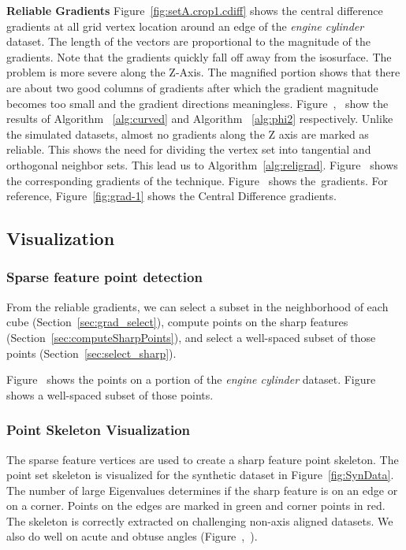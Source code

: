\textbf{Reliable Gradients} 
Figure~\ref{fig:setA.crop1.cdiff} shows the central difference gradients at all grid vertex location around an edge of the \textit{engine cylinder} dataset.
The length of the vectors are proportional to the magnitude of the gradients. Note that the gradients quickly fall off away from the isosurface. 
The problem is more severe along the Z-Axis. 
The magnified portion shows that there are about two good columns of gradients after which the gradient magnitude becomes too small and the gradient directions meaningless. 
Figure~,~ show the results of Algorithm ~\ref{alg:curved} and Algorithm ~\ref{alg:phi2} respectively. Unlike the simulated datasets, almost no gradients along the Z axis are marked as reliable. This shows the need for dividing the vertex set into tangential and orthogonal neighbor sets. This lead us to Algorithm~\ref{alg:religrad}. Figure~ shows the corresponding gradients of the \FindReliable technique. Figure~ shows the~\ReliGrad gradients. For reference, Figure~\ref{fig:grad-1} shows the Central Difference gradients. 
  
\subsection{Visualization}
\subsubsection{Sparse feature point detection}
\label{sec:sparsePointExtraction}

From the reliable gradients, we can select a subset in the neighborhood of each cube (Section~\ref{sec:grad_select}),
compute points on the sharp features (Section~\ref{sec:computeSharpPoints}),
and select a well-spaced subset 
of those points (Section~\ref{sec:select_sharp}).

Figure~ shows the points on
a portion of the \textit{ engine cylinder} dataset.  
Figure~ shows a well-spaced subset 
of those points.

\subsubsection{Point Skeleton Visualization}
The sparse feature vertices are used to create a sharp feature point skeleton. The point set skeleton is visualized for the synthetic dataset in Figure~\ref{fig:SynData}. The number of large Eigenvalues determines if the sharp feature is on an edge or on a corner. Points on the edges are marked in green and corner points in red.
The skeleton is correctly extracted on challenging non-axis aligned datasets. We also do well on  acute and obtuse angles (Figure~,~).

